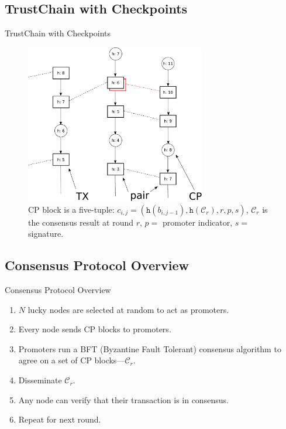 \documentclass{beamer}
\begin{document}
\subsection{TrustChain with Checkpoints}
\begin{frame}{TrustChain with Checkpoints}

  \begin{figure}[h]
  \includegraphics[width=0.7\textwidth]{figures/trustchain-bad-cp}
  \centering
  \caption{CP block is a five-tuple: $c_{i,j} = (\texttt{h}(b_{i,j-1}),
    \texttt{h}(\mathcal{C}_r), r, p, s)$, $\mathcal{C}_r$ is the consensus
    result at round $r$, $p =$ promoter indicator, $s =$ signature.}
  \end{figure}

\end{frame}

\subsection{Consensus Protocol Overview}
\begin{frame}{Consensus Protocol Overview}
  \begin{enumerate}
    \item $N$ lucky nodes are selected at random to act as promoters.
    \item Every node sends CP blocks to promoters.
    \item Promoters run a BFT (Byzantine Fault Tolerant) consensus algorithm to
      agree on a set of CP blocks---$\mathcal{C}_r$.
    \item Disseminate $\mathcal{C}_r$.
    \item Any node can verify that their transaction is in consensus.
    \item Repeat for next round.
  \end{enumerate}
\end{frame}
\end{document}
